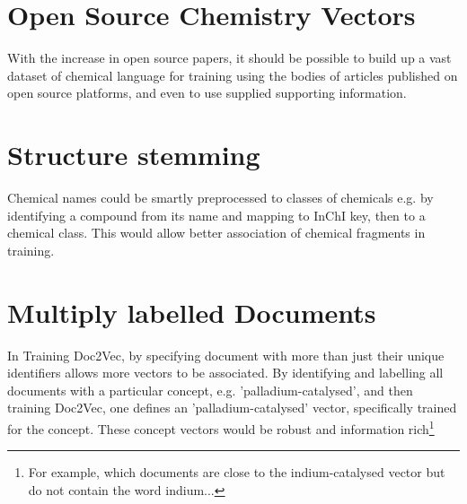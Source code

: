 \section{Open Source Chemistry Vectors}
With the increase in open source papers, it should be possible to build up a vast dataset of chemical language for training using the bodies of articles published on open source platforms, and even to use supplied supporting information. 
\section{Structure stemming}
Chemical names could be smartly preprocessed to classes of chemicals e.g. by identifying a compound from its name and mapping to InChI key, then to a chemical class. This would allow better association of chemical fragments in training.
\section{Multiply labelled Documents}
In Training Doc2Vec, by specifying document with more than just their unique identifiers allows more vectors to be associated. By identifying and labelling all documents with a particular concept, e.g. 'palladium-catalysed', and then training Doc2Vec, one defines an 'palladium-catalysed' vector, specifically trained for the concept. These concept vectors would be robust and information rich\footnote{For example, which documents are close to the indium-catalysed vector but do not contain the word indium...}
